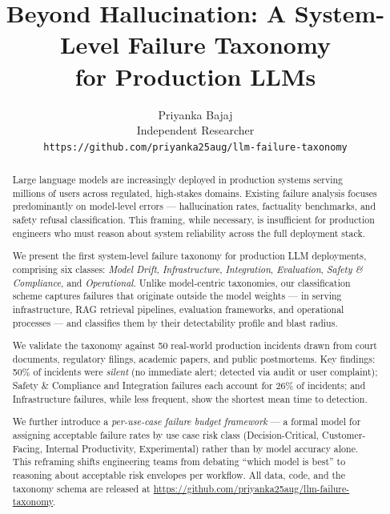 \documentclass{article}
\title{Beyond Hallucination: A System-Level Failure Taxonomy\\
       for Production LLMs}
\author{%
  Priyanka Bajaj \\
  Independent Researcher \\
  \texttt{https://github.com/priyanka25aug/llm-failure-taxonomy}
}
\begin{document}
\sloppy   %

\maketitle

\begin{abstract}
Large language models are increasingly deployed in production systems serving
millions of users across regulated, high-stakes domains.  Existing failure
analysis focuses predominantly on model-level errors --- hallucination rates,
factuality benchmarks, and safety refusal classification.  This framing, while
necessary, is insufficient for production engineers who must reason about
system reliability across the full deployment stack.

We present the first system-level failure taxonomy for production LLM
deployments, comprising six classes: \emph{Model Drift}, \emph{Infrastructure},
\emph{Integration}, \emph{Evaluation}, \emph{Safety \& Compliance}, and
\emph{Operational}.  Unlike model-centric taxonomies, our classification scheme
captures failures that originate outside the model weights --- in serving
infrastructure, RAG retrieval pipelines, evaluation frameworks, and operational
processes --- and classifies them by their detectability profile and blast
radius.

We validate the taxonomy against 50 real-world production incidents drawn from
court documents, regulatory filings, academic papers, and public postmortems.
Key findings: 50\% of incidents were \emph{silent} (no immediate alert; detected
via audit or user complaint); Safety \& Compliance and Integration failures each
account for 26\% of incidents; and Infrastructure failures, while less frequent,
show the shortest mean time to detection.

We further introduce a \emph{per-use-case failure budget framework} --- a
formal model for assigning acceptable failure rates by use case risk class
(Decision-Critical, Customer-Facing, Internal Productivity, Experimental) rather
than by model accuracy alone.  This reframing shifts engineering teams from
debating ``which model is best'' to reasoning about acceptable risk envelopes
per workflow.  All data, code, and the taxonomy schema are released at
\url{https://github.com/priyanka25aug/llm-failure-taxonomy}.
\end{abstract}
\end{document}
